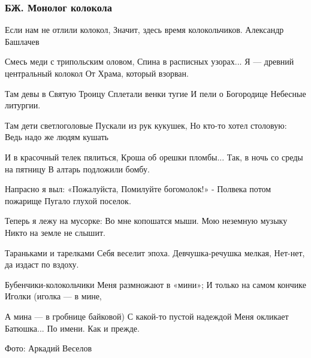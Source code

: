  
 
 

\subsubsection{БЖ. Монолог колокола}
\label{sec:poetry.rus.evgenija_bilchenko.kolokola}

Если нам не отлили колокол,
Значит, здесь время колокольчиков.
Александр Башлачев

Смесь меди с трипольским оловом,
Спина в расписных узорах...
Я --- древний центральный колокол
От Храма, который взорван.

Там девы в Святую Троицу
Сплетали венки тугие
И пели о Богородице
Небесные литургии.

Там дети светлоголовые
Пускали из рук кукушек,
Но кто-то хотел столовую:
Ведь надо же людям кушать

И в красочный телек пялиться,
Кроша об орешки пломбы...
Так, в ночь со среды на пятницу
В алтарь подложили бомбу.

Напрасно я выл: «Пожалуйста,
Помилуйте богомолок!» -
Полвека потом пожарище
Пугало глухой поселок.

Теперь я лежу на мусорке:
Во мне копошатся мыши.
Мою неземную музыку
Никто на земле не слышит.

Тараньками и тарелками
Себя веселит эпоха.
Девчушка-речушка мелкая,
Нет-нет, да издаст по вздоху.

Бубенчики-колокольчики
Меня размножают в «мини»;
И только на самом кончике
Иголки (иголка --- в мине,

А мина --- в гробнице байковой)
С какой-то пустой надеждой
Меня окликает Батюшка...
По имени.
Как и прежде.

Фото: Аркадий Веселов
